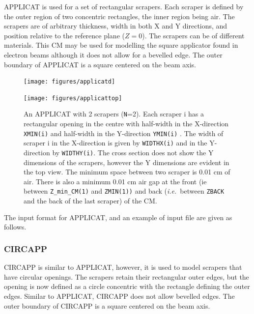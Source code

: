 \documentclass[12pt,twoside]{article}
\newcommand{\ie}{{\em i.e.}}
\begin{document}
APPLICAT is used for a set of rectangular scrapers. Each scraper is defined by
the outer region of two concentric rectangles, the inner region being air.  The
scrapers are of arbitrary thickness, width in both X and Y directions, and
position relative to the
reference plane ($Z = 0$). The scrapers can be  of different  materials.
This CM may be used for modelling the square applicator found in electron
beams although it does
not allow for a bevelled edge.  The outer boundary of APPLICAT is a square
centered on the beam axis.

\begin{figure}[htp]
\begin{center}
\leavevmode
\texttt{[image: figures/applicatd]}
\end{center}
\vspace{-1.6cm}
\texttt{[image: figures/applicattop]}
\caption[APPLICAT CM geometry]
{An APPLICAT with 2 scrapers ({\tt N}=2).  Each scraper i has a rectangular opening in
the centre with half-width in the X-direction {\tt XMIN(i)} and half-width in
the Y-direction {\tt YMIN(i)}
.  The width of scraper i in the
X-direction is given by
{\tt WIDTHX(i)} and in the Y-direction by {\tt WIDTHY(i)}.  The cross section does
not show the Y dimensions of the scrapers, however the Y dimensions are
evident in the top view.  The minimum space
between two scraper is 0.01
cm of air.  There is also a minimum 0.01 cm air gap at the front (ie
between {\tt Z\_min\_CM(1)}
 and {\tt ZMIN(1))} and back (\ie\ between {\tt ZBACK} and the back
of the last scraper) of
the CM.}
\label{fig_APPLICATD}
\end{figure}

\clearpage

The input format for APPLICAT, and an example of input file are given as follows.

\begin{small}

\end{small}

\clearpage
\vspace*{-1cm}
\subsubsection{CIRCAPP}
\renewcommand{\rightmark}{CIRCAPP CM}

CIRCAPP is similar to APPLICAT, however, it is used to model scrapers that have
circular openings.  The scrapers retain their rectangular outer edges, but
the opening is now defined as a circle concentric with the rectangle
defining the outer edges.  Similar to APPLICAT, CIRCAPP does not allow
bevelled edges. The outer boundary of CIRCAPP is a square centered on the beam axis.
\end{document}
